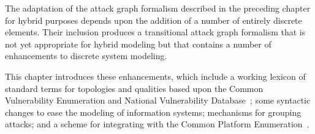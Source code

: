 The adaptation of the attack graph formalism described in
the preceding chapter for hybrid purposes depends upon the addition of a number
of entirely discrete elements. Their inclusion produces a transitional
attack graph formalism that is not yet appropriate for hybrid modeling but that
contains a number of enhancements to discrete system modeling.

This chapter introduces these enhancements, which include a working lexicon of
standard terms for topologies and qualities based upon the Common Vulnerability
Enumeration and National Vulnerability Database~\cite{nvdhome}; some syntactic
changes to ease the modeling of information systems;
mechanisms for grouping attacks; and a scheme for integrating with
the Common Platform Enumeration~\cite{buttner2009common}.

